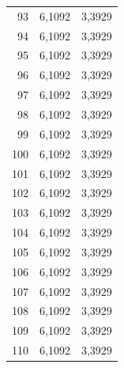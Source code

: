 \begin{small}
\begin{longtable}{rrr}
93 & 6,1092 & 3,3929 \\
94 & 6,1092 & 3,3929 \\
95 & 6,1092 & 3,3929 \\
96 & 6,1092 & 3,3929 \\
97 & 6,1092 & 3,3929 \\
98 & 6,1092 & 3,3929 \\
99 & 6,1092 & 3,3929 \\
100 & 6,1092 & 3,3929 \\
101 & 6,1092 & 3,3929 \\
102 & 6,1092 & 3,3929 \\
103 & 6,1092 & 3,3929 \\
104 & 6,1092 & 3,3929 \\
105 & 6,1092 & 3,3929 \\
106 & 6,1092 & 3,3929 \\
107 & 6,1092 & 3,3929 \\
108 & 6,1092 & 3,3929 \\
109 & 6,1092 & 3,3929 \\
110 & 6,1092 & 3,3929 \\
\end{longtable}
\end{small}
